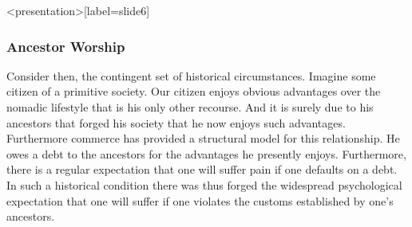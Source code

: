 \begin{frame}<presentation>[label=slide6]
    \frametitle{Ancestor Worship}
\end{frame}

Consider then, the contingent set of historical circumstances. Imagine some citizen of a primitive society. Our citizen enjoys obvious advantages over the nomadic lifestyle that is his only other recourse. And it is surely due to his ancestors that forged his society that he now enjoys such advantages. Furthermore commerce has provided a structural model for this relationship. He owes a debt to the ancestors for the advantages he presently enjoys. Furthermore, there is a regular expectation that one will suffer pain if one defaults on a debt. In such a historical condition there was thus forged the widespread psychological expectation that one will suffer if one violates the customs established by one's ancestors. \change

